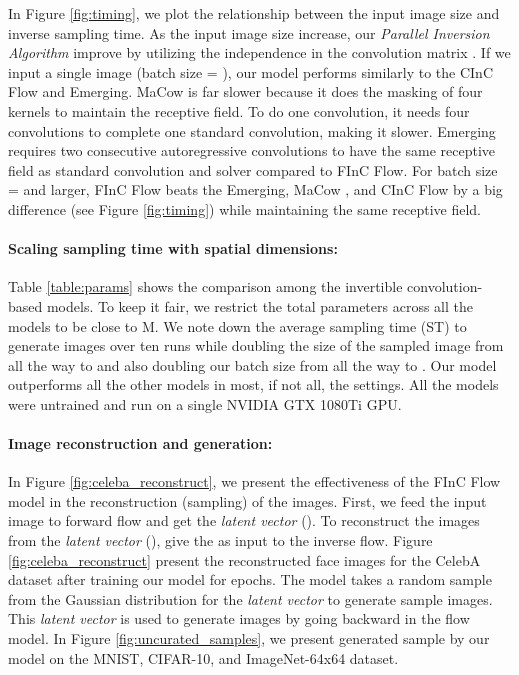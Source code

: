 \documentclass[a4paper,twoside]{article}
\theoremstyle{definition}
\begin{document}
In Figure \ref{fig:timing}, we plot the relationship between the input image size and inverse sampling time. As the input image size increase, our \emph{Parallel Inversion Algorithm} improve by utilizing the independence in the convolution matrix . If we input a single image (batch size = ), our model performs similarly to the CInC Flow and Emerging. MaCow is far slower because it does the masking of four kernels to maintain the receptive field. To do one convolution, it needs four convolutions to complete one standard convolution, making it slower. Emerging requires two consecutive autoregressive convolutions to have the same receptive field as standard convolution and solver compared to FInC Flow. For batch size =  and larger, FInC Flow beats the Emerging, MaCow , and CInC Flow by a big difference (see Figure \ref{fig:timing}) while maintaining the same receptive field. 


\paragraph{Scaling sampling time with spatial dimensions:}
Table \ref{table:params} shows the comparison among the invertible convolution-based models. To keep it fair, we restrict the total parameters across all the models to be close to  M. We note down the average sampling time (ST) to generate  images over ten runs while doubling the size of the sampled image from  all the way to  and also doubling our batch size from  all the way to . Our model outperforms all the other models in most, if not all, the settings. All the models were untrained and run on a single NVIDIA GTX 1080Ti GPU.
\paragraph{Image reconstruction and generation:}
In Figure \ref{fig:celeba_reconstruct}, we present the effectiveness of the  FInC Flow model in the reconstruction (sampling) of the images. First, we feed the input image to forward flow and get the \emph{latent vector} (). To reconstruct the images from the \emph{latent vector} (), give the  as input to the inverse flow. Figure \ref{fig:celeba_reconstruct} present the reconstructed face images for the CelebA dataset after training our model for  epochs. The model takes a random sample from the Gaussian distribution for the \emph{latent vector} to generate sample images. This \emph{latent vector} is used to generate images by going backward in the flow model. In Figure \ref{fig:uncurated_samples}, we present generated sample by our model on the MNIST, CIFAR-10, and ImageNet-64x64 dataset.
\end{document}
